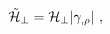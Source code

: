 \begin{equation}
\tilde{{\cal H}}_{\perp} = {\cal H}_{\perp}   |\gamma_{,\rho}|  \ ,
\label{ham}
\end{equation}

